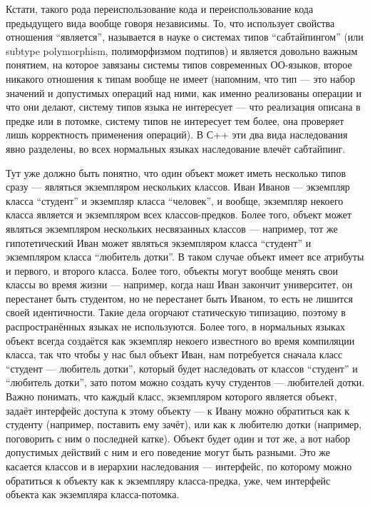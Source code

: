 \documentclass[a5paper]{article}
\begin{document}
Кстати, такого рода переиспользование кода и переиспользование кода предыдущего вида вообще говоря независимы. То, что использует свойства отношения ``является'', называется в науке о системах типов ``сабтайпингом'' (или subtype polymorphism, полиморфизмом подтипов) и является довольно важным понятием, на которое завязаны системы типов современных ОО-языков, второе никакого отношения к типам вообще не имеет (напомним, что тип --- это набор значений и допустимых операций над ними, как именно реализованы операции и что они делают, систему типов языка не интересует --- что реализация описана в предке или в потомке, систему типов не интересует тем более, она проверяет лишь корректность применения операций). В С++ эти два вида наследования явно разделены, во всех нормальных языках наследование влечёт сабтайпинг.

Тут уже должно быть понятно, что один объект может иметь несколько типов сразу --- являться экземпляром нескольких классов. Иван Иванов --- экземпляр класса ``студент'' и экземпляр класса ``человек'', и вообще, экземпляр некоего класса является и экземпляром всех классов-предков. Более того, объект может являться экземпляром нескольких несвязанных классов --- например, тот же гипотетический Иван может являться экземпляром класса ``студент'' и экземпляром класса ``любитель дотки''. В таком случае объект имеет все атрибуты и первого, и второго класса. Более того, объекты могут вообще менять свои классы во время жизни --- например, когда наш Иван закончит университет, он перестанет быть студентом, но не перестанет быть Иваном, то есть не лишится своей идентичности. Такие дела огорчают статическую типизацию, поэтому в распространённых языках не используются. Более того, в нормальных языках объект всегда создаётся как экземпляр некоего известного во время компиляции класса, так что чтобы у нас был объект Иван, нам потребуется сначала класс ``студент --- любитель дотки'', который будет наследовать от классов ``студент'' и ``любитель дотки'', зато потом можно создать кучу студентов --- любителей дотки. Важно понимать, что каждый класс, экземпляром которого является объект, задаёт интерфейс доступа к этому объекту --- к Ивану можно обратиться как к студенту (например, поставить ему зачёт), или как к любителю дотки (например, поговорить с ним о последней катке). Объект будет один и тот же, а вот набор допустимых действий с ним и его поведение могут быть разными. Это же касается классов и в иерархии наследования --- интерфейс, по которому можно обратиться к объекту как к экземпляру класса-предка, уже, чем интерфейс объекта как экземпляра класса-потомка.
\end{document}
